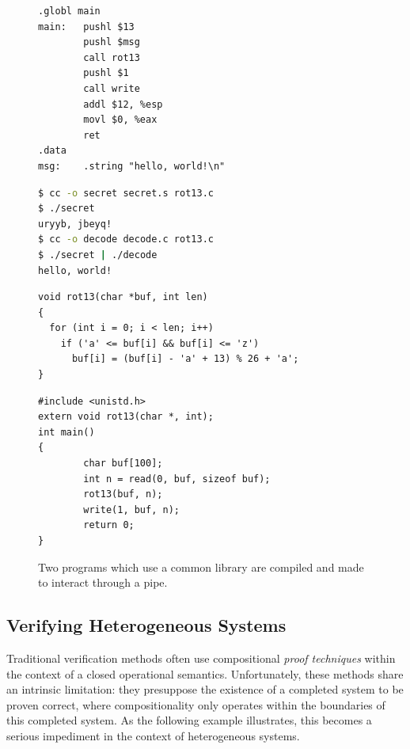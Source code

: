 \begin{figure} %
\centering
\begin{minipage}{.35\textwidth}
\begin{lstlisting}[title={secret.s}]
.globl main
main:   pushl $13
        pushl $msg
        call rot13
        pushl $1
        call write
        addl $12, %esp
        movl $0, %eax
        ret
.data
msg:    .string "hello, world!\n"
\end{lstlisting}
\vspace{1em}
\begin{lstlisting}[language=sh]
$ cc -o secret secret.s rot13.c
$ ./secret
uryyb, jbeyq!
$ cc -o decode decode.c rot13.c
$ ./secret | ./decode
hello, world!
\end{lstlisting}
\end{minipage}
\hspace{2.5em}
\begin{minipage}{.48\textwidth}
\begin{lstlisting}[title={rot13.c}]
void rot13(char *buf, int len)
{
  for (int i = 0; i < len; i++)
    if ('a' <= buf[i] && buf[i] <= 'z')
      buf[i] = (buf[i] - 'a' + 13) % 26 + 'a';
}
\end{lstlisting}
\begin{lstlisting}[title={decode.c}]
#include <unistd.h>
extern void rot13(char *, int);
int main()
{
        char buf[100];
        int n = read(0, buf, sizeof buf);
        rot13(buf, n);
        write(1, buf, n);
        return 0;
}
\end{lstlisting}
\end{minipage}
\caption{Two programs which use a common library
  are compiled and made to
  interact through a pipe.}
\label{fig:readwritehello}
\end{figure}

\subsection{Verifying Heterogeneous Systems} \label{ssec:intro-dhs} %

Traditional verification methods
often use compositional \emph{proof techniques}
within the context of a closed operational semantics.
Unfortunately, these methods share an intrinsic limitation: they
presuppose the existence of a completed system to be proven correct,
where compositionality only operates within the boundaries
of this completed system.
As the following example illustrates,
this becomes
a serious impediment in the context of heterogeneous
systems.

